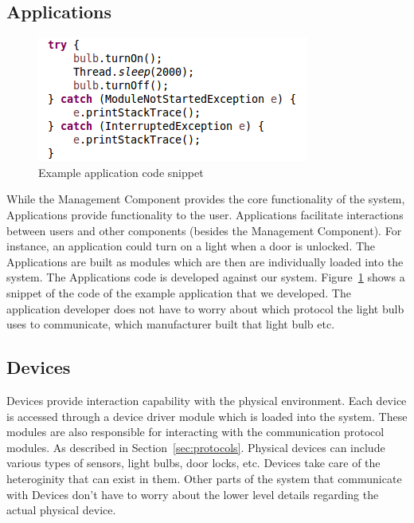 \subsection{Applications}
\label{sec:apps}
\begin{figure}[tbh]                                                              
    \centering                                                                   
    \includegraphics[width=1.0\columnwidth]{figs/appcode.png}                       
    \caption{Example application code snippet}                                  
    \label{Fig:appcode}                                                             
\end{figure} 
While the Management Component provides the core functionality of the system,
Applications provide functionality to the user. Applications facilitate
interactions between users and other components (besides the Management
Component). For instance, an application could turn on a light when a door is
unlocked. The Applications are built as modules which are then are individually
loaded into the system. The Applications code is developed against our system.
Figure~\ref{Fig:appcode} shows a snippet of the code of the example application
that we developed. The application developer does not have to worry about which
protocol the light bulb uses to communicate, which manufacturer built that light
bulb etc.
\subsection{Devices}
\label{sec:devices}
Devices provide interaction capability with the physical environment. Each
device is accessed through a device driver module which is loaded into the
system. These modules are also responsible for interacting with the
communication protocol modules. As described in Section~\ref{sec:protocols}.
Physical devices can include various types of sensors, light bulbs, door locks,
etc. Devices take care of the heteroginity that can exist in them. Other parts
of the system that communicate with Devices don't have to worry about the lower
level details regarding the actual physical device.
